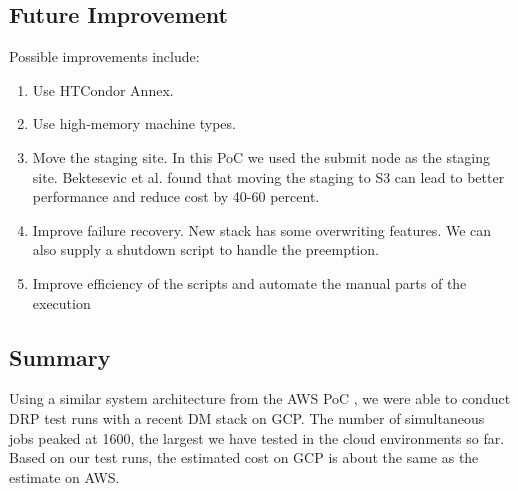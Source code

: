 \subsection{Future Improvement} \label{sec:future}

Possible improvements include:
\begin{enumerate}
\item Use HTCondor Annex.
\item Use high-memory machine types.
\item Move the staging site. In this PoC we used the submit node as the staging site. Bektesevic et al. found that moving the staging to S3 can lead to better performance and reduce cost by 40-60 percent.
\item Improve failure recovery. New stack has some overwriting features. We can also supply a shutdown script to handle the preemption.
\item Improve efficiency of the scripts and automate the manual parts of the execution
\end{enumerate}

\subsection{Summary}
Using a similar system architecture from the AWS PoC , we were able to conduct DRP test runs with a recent DM stack on GCP.
The number of simultaneous jobs peaked at 1600, the largest we have tested in the cloud environments so far.
Based on our test runs, the estimated cost on GCP is about the same as the estimate on AWS.
